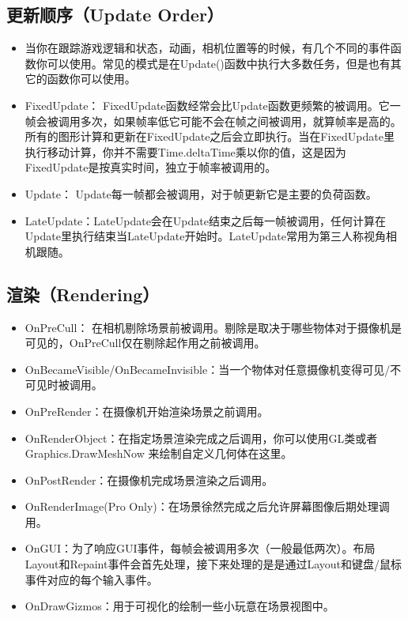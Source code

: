 \documentclass[9pt, b5paper]{article}
\begin{document}
\subsection{更新顺序（Update Order）}
\label{sec:org6eadb93}
\begin{itemize}
\item 当你在跟踪游戏逻辑和状态，动画，相机位置等的时候，有几个不同的事件函数你可以使用。常见的模式是在Update()函数中执行大多数任务，但是也有其它的函数你可以使用。
\item FixedUpdate： FixedUpdate函数经常会比Update函数更频繁的被调用。它一帧会被调用多次，如果帧率低它可能不会在帧之间被调用，就算帧率是高的。所有的图形计算和更新在FixedUpdate之后会立即执行。当在FixedUpdate里执行移动计算，你并不需要Time.deltaTime乘以你的值，这是因为FixedUpdate是按真实时间，独立于帧率被调用的。
\item Update： Update每一帧都会被调用，对于帧更新它是主要的负荷函数。
\item LateUpdate：LateUpdate会在Update结束之后每一帧被调用，任何计算在Update里执行结束当LateUpdate开始时。LateUpdate常用为第三人称视角相机跟随。
\end{itemize}
\subsection{渲染（Rendering）}
\label{sec:org2b1c833}
\begin{itemize}
\item OnPreCull： 在相机剔除场景前被调用。剔除是取决于哪些物体对于摄像机是可见的，OnPreCull仅在剔除起作用之前被调用。
\item OnBecameVisible/OnBecameInvisible：当一个物体对任意摄像机变得可见/不可见时被调用。
\item OnPreRender：在摄像机开始渲染场景之前调用。
\item OnRenderObject：在指定场景渲染完成之后调用，你可以使用GL类或者Graphics.DrawMeshNow 来绘制自定义几何体在这里。
\item OnPostRender：在摄像机完成场景渲染之后调用。
\item OnRenderImage(Pro Only)：在场景徐然完成之后允许屏幕图像后期处理调用。
\item OnGUI：为了响应GUI事件，每帧会被调用多次（一般最低两次）。布局Layout和Repaint事件会首先处理，接下来处理的是是通过Layout和键盘/鼠标事件对应的每个输入事件。
\item OnDrawGizmos：用于可视化的绘制一些小玩意在场景视图中。
\end{itemize}
\end{document}
